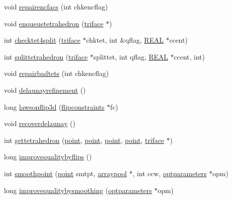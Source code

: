 \begin{DoxyCompactItemize}
\item 
void \hyperlink{classtetgenmesh_a701d4f317ed66df6a2e2b7b237e2386a}{repairencfacs} (int chkencflag)
\item 
void \hyperlink{classtetgenmesh_a86e87c56bd1717f1741adca87cb21acb}{enqueuetetrahedron} (\hyperlink{classtetgenmesh_1_1triface}{triface} $\ast$)
\item 
int \hyperlink{classtetgenmesh_ad4bfeb6c3c912f5d59f3e7784df98517}{checktet4split} (\hyperlink{classtetgenmesh_1_1triface}{triface} $\ast$chktet, int \&qflag, \hyperlink{tetgen_8h_a4b654506f18b8bfd61ad2a29a7e38c25}{R\-E\-A\-L} $\ast$ccent)
\item 
int \hyperlink{classtetgenmesh_aa752155eb1d18550a212dd40297f122e}{splittetrahedron} (\hyperlink{classtetgenmesh_1_1triface}{triface} $\ast$splittet, int qflag, \hyperlink{tetgen_8h_a4b654506f18b8bfd61ad2a29a7e38c25}{R\-E\-A\-L} $\ast$ccent, int)
\item 
void \hyperlink{classtetgenmesh_a7c46c82d83099214115fa9719aefbd78}{repairbadtets} (int chkencflag)
\item 
void \hyperlink{classtetgenmesh_a477bbfde72103de66546d4ea3343b4a1}{delaunayrefinement} ()
\item 
long \hyperlink{classtetgenmesh_a6755cfa20d8ea6ce62d059750657a292}{lawsonflip3d} (\hyperlink{classtetgenmesh_1_1flipconstraints}{flipconstraints} $\ast$fc)
\item 
void \hyperlink{classtetgenmesh_a4f6f365744005e9d9da43a7d8a1fbba8}{recoverdelaunay} ()
\item 
int \hyperlink{classtetgenmesh_aeaa9ecb1ea77f736117b9dd6ee5855fc}{gettetrahedron} (\hyperlink{classtetgenmesh_ace3fb4f80389185b7c9b18ab69a3dea2}{point}, \hyperlink{classtetgenmesh_ace3fb4f80389185b7c9b18ab69a3dea2}{point}, \hyperlink{classtetgenmesh_ace3fb4f80389185b7c9b18ab69a3dea2}{point}, \hyperlink{classtetgenmesh_ace3fb4f80389185b7c9b18ab69a3dea2}{point}, \hyperlink{classtetgenmesh_1_1triface}{triface} $\ast$)
\item 
long \hyperlink{classtetgenmesh_a3d724f195ed9c3f5e1378d1f4f0c5282}{improvequalitybyflips} ()
\item 
int \hyperlink{classtetgenmesh_a8edf1b91719a1e64acd4fe8617184905}{smoothpoint} (\hyperlink{classtetgenmesh_ace3fb4f80389185b7c9b18ab69a3dea2}{point} smtpt, \hyperlink{classtetgenmesh_1_1arraypool}{arraypool} $\ast$, int ccw, \hyperlink{classtetgenmesh_1_1optparameters}{optparameters} $\ast$opm)
\item 
long \hyperlink{classtetgenmesh_a1d652618e67ac4ff3057373e15016181}{improvequalitybysmoothing} (\hyperlink{classtetgenmesh_1_1optparameters}{optparameters} $\ast$opm)

\end{DoxyCompactItemize}
